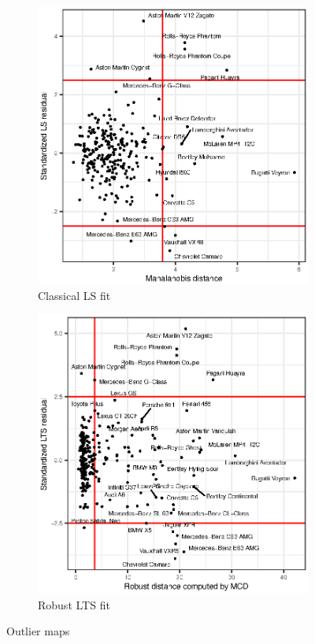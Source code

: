 \documentclass[titlepage]{article}
\begin{document}
\begin{landscape}
  \begin{figure}
    \begin{subfigure}{0.5\linewidth}
      \includegraphics{q3-outlier-classic}
      \caption{Classical LS fit}
      \label{fig:q3-outlier-classic}
    \end{subfigure}
    \begin{subfigure}{0.5\linewidth}
      \includegraphics{q3-outlier-rob}
      \caption{Robust LTS fit}
    \end{subfigure}
    \caption{Outlier maps}
    \label{fig:q3-outlier-maps}
  \end{figure}
\end{landscape}
\end{document}
